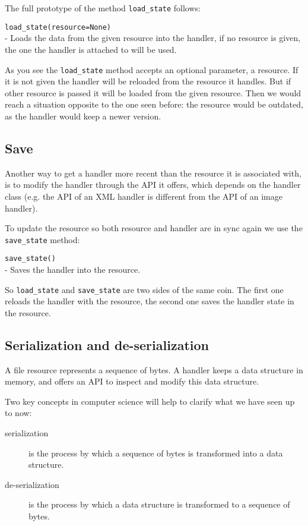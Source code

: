 The full prototype of the method {\tt load\_state} follows:

\begin{api}
  {\tt load\_state(resource=None)}\\
  - Loads the data from the given resource into the handler, if no
    resource is given, the one the handler is attached to will be used.
\end{api}

As you see the {\tt load\_state} method accepts an optional parameter, a
resource. If it is not given the handler will be reloaded from the resource
it handles. But if other resource is passed it will be loaded from the given
resource. Then we would reach a situation opposite to the one seen before:
the resource would be outdated, as the handler would keep a newer version.


\subsection{Save}

Another way to get a handler more recent than the resource it is associated
with, is to modify the handler through the API it offers, which depends
on the handler class (e.g. the API of an XML handler is different from the
API of an image handler).

To update the resource so both resource and handler are in sync again we
use the {\tt save\_state} method:

\begin{api}
  {\tt save\_state()}\\
  - Saves the handler into the resource.
\end{api}

So {\tt load\_state} and {\tt save\_state} are two sides of the same coin.
The first one reloads the handler with the resource, the second one saves
the handler state in the resource.


\subsection{Serialization and de-serialization}

A file resource represents a sequence of bytes. A handler keeps a data
structure in memory, and offers an API to inspect and modify this data
structure.

Two key concepts in computer science will help to clarify what we have
seen up to now:

\begin{description}
  \item [serialization] is the process by which a sequence of bytes is
    transformed into a data structure.

  \item [de-serialization] is the process by which a data structure is
    transformed to a sequence of bytes.
\end{description}

